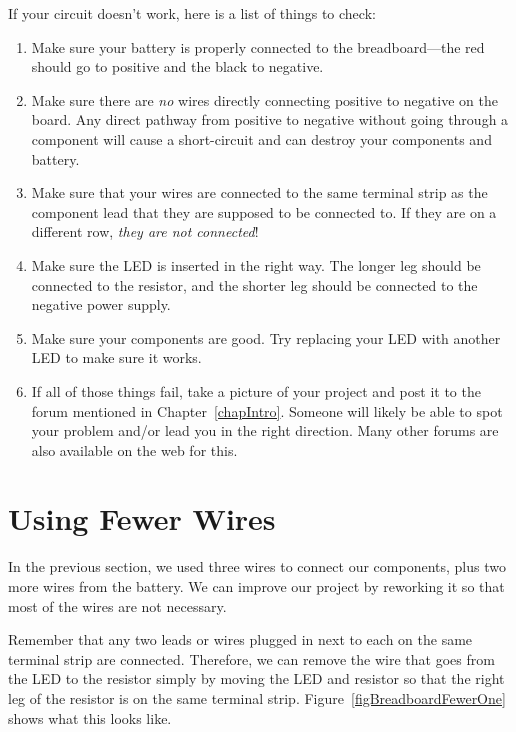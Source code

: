 If your circuit doesn't work, here is a list of things to check:
\begin{enumerate}
\item Make sure your battery is properly connected to the breadboard---the red should go to positive and the black to negative.
\item Make sure there are \emph{no} wires directly connecting positive to negative on the board.  Any direct pathway from positive to negative without going through a component will cause a short-circuit and can destroy your components and battery.
\item Make sure that your wires are connected to the same terminal strip as the component lead that they are supposed to be connected to.  If they are on a different row, \emph{they are not connected}!
\item Make sure the LED is inserted in the right way.  The longer leg should be connected to the resistor, and the shorter leg should be connected to the negative power supply.
\item Make sure your components are good.  Try replacing your LED with another LED to make sure it works.
\item If all of those things fail, take a picture of your project and post it to the forum mentioned in Chapter~\ref{chapIntro}.  Someone will likely be able to spot your problem and/or lead you in the right direction.  Many other forums are also available on the web for this.
\end{enumerate}

\section{Using Fewer Wires}

In the previous section, we used three wires to connect our components, plus two more wires from the battery.
We can improve our project by reworking it so that most of the wires are not necessary.

Remember that any two leads or wires plugged in next to each on the same terminal strip are connected.
Therefore, we can remove the wire that goes from the LED to the resistor simply by moving the LED and resistor so that the right leg of the resistor is on the same terminal strip.
Figure~\ref{figBreadboardFewerOne} shows what this looks like.



